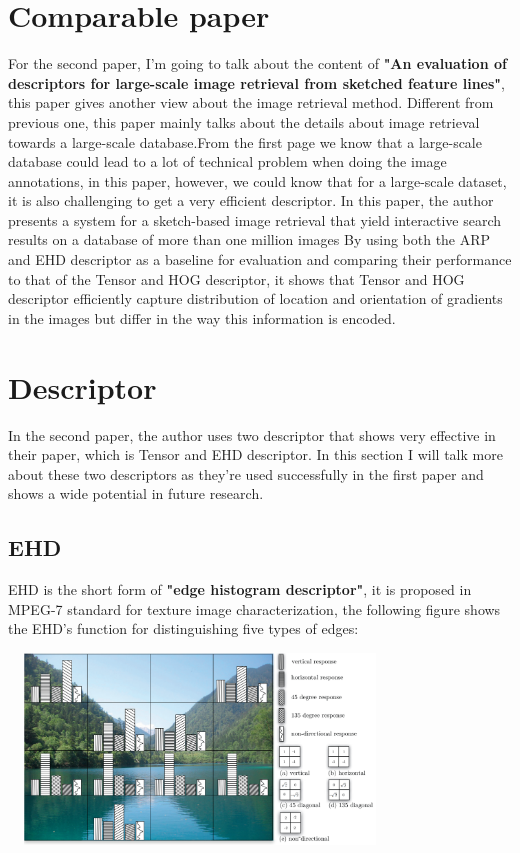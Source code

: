 \documentclass[pdftex,12pt,a4paper]{article}
\begin{document}
\section{Comparable paper}
For the second paper, I'm going to talk about the content of \textbf{"An evaluation of descriptors for large-scale image retrieval from sketched feature lines"}, this paper gives another view about the image retrieval method. Different from
previous one, this paper mainly talks about the details about image retrieval towards a large-scale database.From the first
page we know that a large-scale database could lead to a lot of technical problem when doing the image annotations, in this
paper, however, we could know that for a large-scale dataset, it is also challenging to get a very efficient descriptor. In
this paper, the author presents a system for a sketch-based image retrieval that yield interactive search results on a database of more than one million images By using both the ARP and EHD descriptor as a baseline for evaluation and comparing
their performance to that of the Tensor and HOG descriptor, it shows that Tensor and HOG descriptor efficiently capture distribution of location and orientation of gradients in the images but differ in the way this information is encoded.

\section{Descriptor}
In the second paper, the author uses two descriptor that shows very effective in their paper, which is Tensor and EHD descriptor. In this section I will talk more about these two descriptors as they're used successfully in the first paper and
shows a wide potential in future research.
\subsection{EHD}
EHD is the short form of \textbf{"edge histogram descriptor"}, it is proposed in MPEG-7 standard for texture image characterization, the following figure shows the EHD's function for distinguishing five types of edges:

\begin{center} %
\includegraphics[width=4.00in,height=2.00in]{let-rev2_1.png}
\end{center}
\end{document}
